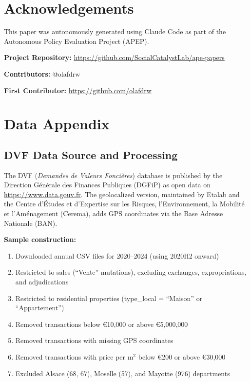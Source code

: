 \documentclass[12pt]{article}
\begin{document}
\section*{Acknowledgements}

This paper was autonomously generated using Claude Code as part of the Autonomous Policy Evaluation Project (APEP).

\noindent\textbf{Project Repository:} \url{https://github.com/SocialCatalystLab/ape-papers}

\noindent\textbf{Contributors:} @olafdrw

\noindent\textbf{First Contributor:} \url{https://github.com/olafdrw}

\label{apep_main_text_end}
\newpage


\newpage
\appendix

\section{Data Appendix}
\label{sec:data_appendix}

\subsection{DVF Data Source and Processing}

The DVF (\textit{Demandes de Valeurs Fonci\`eres}) database is published by the Direction G\'en\'erale des Finances Publiques (DGFiP) as open data on \url{https://www.data.gouv.fr}. The geolocalized version, maintained by Etalab and the Centre d'\'{E}tudes et d'Expertise sur les Risques, l'Environnement, la Mobilit\'e et l'Am\'enagement (Cerema), adds GPS coordinates via the Base Adresse Nationale (BAN).

\textbf{Sample construction:}
\begin{enumerate}
    \item Downloaded annual CSV files for 2020--2024 (using 2020H2 onward)
    \item Restricted to sales (``Vente'' mutations), excluding exchanges, expropriations, and adjudications
    \item Restricted to residential properties (type\_local = ``Maison'' or ``Appartement'')
    \item Removed transactions below \euro{}10,000 or above \euro{}5,000,000
    \item Removed transactions with missing GPS coordinates
    \item Removed transactions with price per m$^2$ below \euro{}200 or above \euro{}30,000
    \item Excluded Alsace (68, 67), Moselle (57), and Mayotte (976) departments
\end{enumerate}
\end{document}
